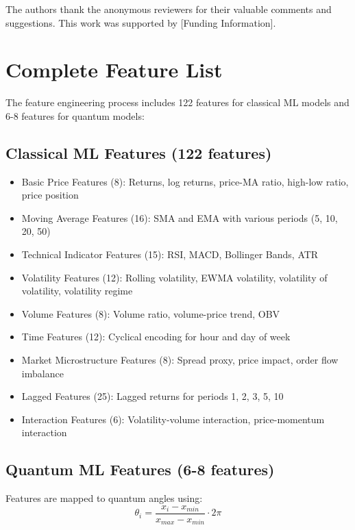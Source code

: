 \documentclass[12pt,a4paper]{article}
\begin{document}
The authors thank the anonymous reviewers for their valuable comments and suggestions. This work was supported by [Funding Information].




\appendix

\section{Complete Feature List}

The feature engineering process includes 122 features for classical ML models and 6-8 features for quantum models:

\subsection{Classical ML Features (122 features)}
\begin{itemize}
    \item Basic Price Features (8): Returns, log returns, price-MA ratio, high-low ratio, price position
    \item Moving Average Features (16): SMA and EMA with various periods (5, 10, 20, 50)
    \item Technical Indicator Features (15): RSI, MACD, Bollinger Bands, ATR
    \item Volatility Features (12): Rolling volatility, EWMA volatility, volatility of volatility, volatility regime
    \item Volume Features (8): Volume ratio, volume-price trend, OBV
    \item Time Features (12): Cyclical encoding for hour and day of week
    \item Market Microstructure Features (8): Spread proxy, price impact, order flow imbalance
    \item Lagged Features (25): Lagged returns for periods 1, 2, 3, 5, 10
    \item Interaction Features (6): Volatility-volume interaction, price-momentum interaction
\end{itemize}

\subsection{Quantum ML Features (6-8 features)}
Features are mapped to quantum angles using:
\begin{equation}
\theta_i = \frac{x_i - x_{min}}{x_{max} - x_{min}} \cdot 2\pi
\end{equation}
\end{document}
